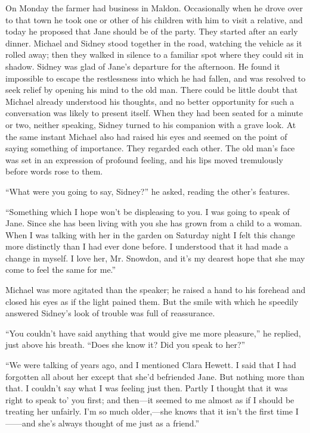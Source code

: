 On Monday the farmer had business in Maldon. Occasionally when he drove
over to that town he took one or other of his children with him to visit
a relative, and today he proposed that Jane should be of the party. They
started after an early dinner. Michael and Sidney stood together in the
road, watching the vehicle as it rolled away; then they walked in
silence to a familiar spot where they could sit in shadow. Sidney was
glad of Jane's departure for the afternoon. He found it impossible to
escape the restlessness into which he had fallen, and was resolved to
seek relief by opening his mind to the old man. There could be little
doubt that Michael already understood his thoughts, and no better
opportunity for such a conversation was likely to present itself. When
they {}had been seated for a minute or two, neither speaking, Sidney
turned to his companion with a grave look. At the same instant Michael
also had raised his eyes and seemed on the point of saying something of
importance. They regarded each other. The old man's face was set in an
expression of profound feeling, and his lips moved tremulously before
words rose to them.

``What were you going to say, Sidney?'' he asked, reading the other's
features.

``Something which I hope won't be displeasing to you. I was going to
speak of Jane. Since she has been living with you she has grown from a
child to a woman. When I was talking with her in the garden on Saturday
night I felt this change more distinctly than I had ever done before. I
understood that it had made a change in myself. I love her, Mr. Snowdon,
and it's my dearest hope that she may come to feel the same for me.''

Michael was more agitated than the speaker; he raised a hand to his
forehead and closed his eyes as if the light pained them. But the
{}smile with which he speedily answered Sidney's look of trouble was
full of reassurance.

``You couldn't have said anything that would give me more pleasure,'' he
replied, just above his breath. ``Does she know it? Did you speak to
her?''

``We were talking of years ago, and I mentioned Clara Hewett. I said
that I had forgotten all about her except that she'd befriended Jane.
But nothing more than that. I couldn't say what I was feeling just then.
Partly I thought that it was right to speak to' you first; and then---it
seemed to me almost as if I should be treating her unfairly. I'm so much
older,---she knows that it isn't the first time I{{------}}and she's
always thought of me just as a friend.''

